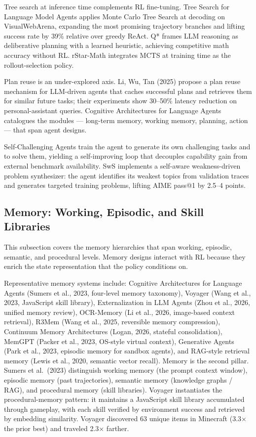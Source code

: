 \documentclass{article}
\begin{document}
Tree search at inference time complements RL fine-tuning. Tree Search for Language Model Agents \citep{koh20242024} applies Monte Carlo Tree Search at decoding on VisualWebArena, expanding the most promising trajectory branches and lifting success rate by 39\% relative over greedy ReAct. Q* \citep{wang20242024} frames LLM reasoning as deliberative planning with a learned heuristic, achieving competitive math accuracy without RL. rStar-Math \citep{guan20252025} integrates MCTS at training time as the rollout-selection policy.

Plan reuse is an under-explored axis. Li, Wu, Tan (2025) propose a plan reuse mechanism for LLM-driven agents that caches successful plans and retrieves them for similar future tasks; their experiments show 30--50\% latency reduction on personal-assistant queries. Cognitive Architectures for Language Agents \citep{sumers20232023} catalogues the modules --- long-term memory, working memory, planning, action --- that span agent designs.

Self-Challenging Agents \citep{zhou20252025} train the agent to generate its own challenging tasks and to solve them, yielding a self-improving loop that decouples capability gain from external benchmark availability. SwS \citep{liang20252025} implements a self-aware weakness-driven problem synthesizer: the agent identifies its weakest topics from validation traces and generates targeted training problems, lifting AIME pass@1 by 2.5--4 points.

\subsection{Memory: Working, Episodic, and Skill Libraries}\label{memory-working-episodic-and-skill-libraries}

This subsection covers the memory hierarchies that span working, episodic, semantic, and procedural levels. Memory designs interact with RL because they enrich the state representation that the policy conditions on.

Representative memory systems include: Cognitive Architectures for Language Agents (Sumers et al., 2023, four-level memory taxonomy), Voyager (Wang et al., 2023, JavaScript skill library), Externalization in LLM Agents (Zhou et al., 2026, unified memory review), OCR-Memory (Li et al., 2026, image-based context retrieval), R3Mem (Wang et al., 2025, reversible memory compression), Continuum Memory Architectures (Logan, 2026, stateful consolidation), MemGPT (Packer et al., 2023, OS-style virtual context), Generative Agents (Park et al., 2023, episodic memory for sandbox agents), and RAG-style retrieval memory (Lewis et al., 2020, semantic vector recall). Memory is the second pillar. Sumers et al.~(2023) distinguish working memory (the prompt context window), episodic memory (past trajectories), semantic memory (knowledge graphs / RAG), and procedural memory (skill libraries). Voyager \citep{wang20232023} instantiates the procedural-memory pattern: it maintains a JavaScript skill library accumulated through gameplay, with each skill verified by environment success and retrieved by embedding similarity. Voyager discovered 63 unique items in Minecraft (3.3× the prior best) and traveled 2.3× farther.
\end{document}
